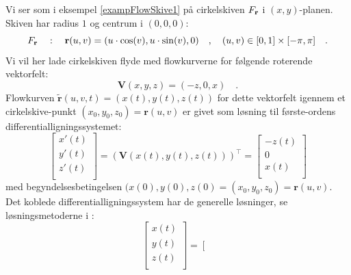 \begin{example} \label{exampSkiveFlowRot}
Vi ser som i eksempel \ref{exampFlowSkive1} på cirkelskiven $F_{\bf r}$ i $(x,y)$-planen. Skiven har  radius $1$ og centrum i $(0,0,0)$:
\begin{equation}
F_{\bf r} \quad : \quad {\bf r}(u,v) = (u\cdot \cos(v), u\cdot \sin(v), 0) \quad , \quad  (u,v) \in [0,1]\times [-\pi, \pi] \quad .
\end{equation}
Vi vil her lade cirkelskiven flyde med flowkurverne for følgende  roterende vektorfelt:
\begin{equation}
\mathbf{V}(x,y,z) = (-z,0, x) \quad .
\end{equation}
Flowkurven $\widetilde{\mathbf{r}}(u,v,t) = (x(t), y(t), z(t))$ for dette vektorfelt igennem et cirkelskive-punkt $(x_{0}, y_{0}, z_{0}) = \mathbf{r}(u,v)$ er givet som løsning til første-ordens differentialligningssystemet:
\begin{equation}
\left[
  \begin{array}{c}
    x'(t) \\
    y'(t) \\
    z'(t) \\
  \end{array}
\right] = (\mathbf{V}(x(t), y(t), z(t)))^{\top} = \left[
                                                    \begin{array}{c}
                                                     -z(t) \\
                                                      0 \\
                                                      x(t) \\
                                                    \end{array}
                                                  \right]
\end{equation}
med begyndelsesbetingelsen $(x(0), y(0), z(0) = (x_{0}, y_{0}, z_{0}) = \mathbf{r}(u,v)$.
Det koblede differentialligningssystem har de generelle løsninger, se løsningsmetoderne i :
\begin{equation}
\left[
  \begin{array}{c}
    x(t) \\
    y(t) \\
    z(t) \\
  \end{array}
\right]
  = \left[
  \begin{array}{c}

\end{array}
\end{equation}
\end{example}

